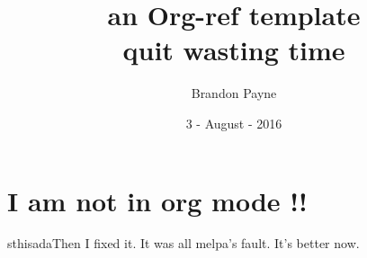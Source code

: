 \documentclass[koma, a4paper, utopia, 12pt]{article}
\author{Brandon Payne 
}
\date{3 - August - 2016}
\title{an Org-ref template\\\medskip
\large quit wasting time}
\begin{document}
\maketitle


\section{I am not in org mode !!}
\label{sec:orgheadline1}

sthisadaThen I fixed it.
It was all melpa's fault.  It's better now.
\end{document}
